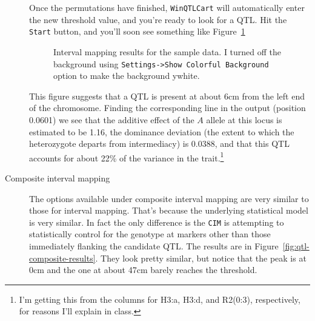 \begin{description}
  Once the permutations have finished, {\tt WinQTLCart} will
  automatically enter the new threshold value, and you're ready to
  look for a QTL. Hit the {\tt Start} button, and you'll soon see
  something like Figure~\ref{fig:qtl-interval-results}

\begin{figure}
\begin{center}
\end{center}
\caption{Interval mapping results for the sample data. I turned off
    the background using {\tt Settings->Show Colorful Background}
    option to make the background ywhite.}\label{fig:qtl-interval-results}
\end{figure}

This figure suggests that a QTL is present at about 6cm from the
left end of the chromosome. Finding the corresponding line in the
output (position 0.0601) we see that the additive effect of the $A$
allele at this locus is estimated to be 1.16, the dominance
deviation (the extent to which the heterozygote departs from
intermediacy) is 0.0388, and that this QTL accounts for about 22\% of
the variance in the trait.\footnote{I'm getting this from the columns
  for H3:a, H3:d, and R2(0:3), respectively, for reasons I'll explain
  in class.}

\item[Composite interval mapping] The options available under
  composite interval mapping are very similar to those for interval
  mapping. That's because the underlying statistical model is very
  similar. In fact the only difference is the {\tt CIM} is attempting
  to statistically control for the genotype at markers other than
  those immediately flanking the candidate QTL. The results are in
  Figure~\ref{fig:qtl-composite-results}. They look pretty similar,
  but notice that the peak is at 0cm and the one at about 47cm barely
  reaches the threshold.


\end{description}
